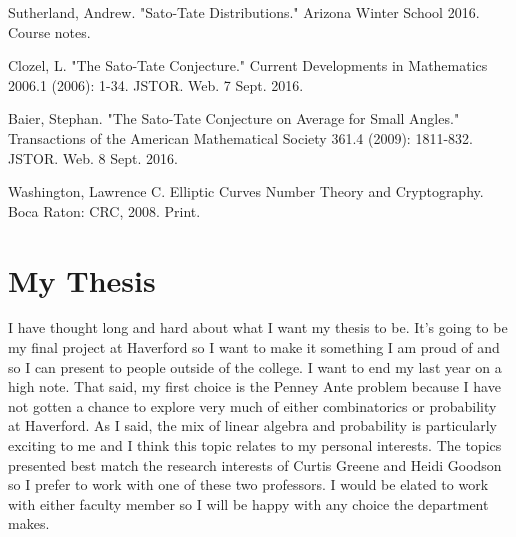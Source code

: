 \documentclass{article}
\numberwithin{mytheorem}{subsection} %
\begin{document}
	\begin{thebibliography}{1}
			Sutherland, Andrew. "Sato-Tate Distributions." Arizona Winter School 2016. Course notes.

			Clozel, L. "The Sato-Tate Conjecture." Current Developments in Mathematics 2006.1 (2006): 1-34. JSTOR. Web. 7 Sept. 2016. 

			Baier, Stephan. "The Sato-Tate Conjecture on Average for Small Angles." Transactions of the American Mathematical Society 361.4 (2009): 1811-832. JSTOR. Web. 8 Sept. 2016.

			 Washington, Lawrence C. Elliptic Curves Number Theory and Cryptography. Boca Raton: CRC, 2008. Print. 

	\end{thebibliography}

	\section*{My Thesis}
		I have thought long and hard about what I want my thesis to be. It's going to be my final project at Haverford so I want to make it something I am proud of and so I can present to people outside of the college. I want to end my last year on a high note. That said, my first choice is the Penney Ante problem because I have not gotten a chance to explore very much of either combinatorics or probability at Haverford. As I said, the mix of linear algebra and probability is particularly exciting to me and I think this topic relates to my personal interests. The topics presented best match the research interests of Curtis Greene and Heidi Goodson so I prefer to work with one of these two professors. I would be elated to work with either faculty member so I will be happy with any choice the department makes.
\end{document}
